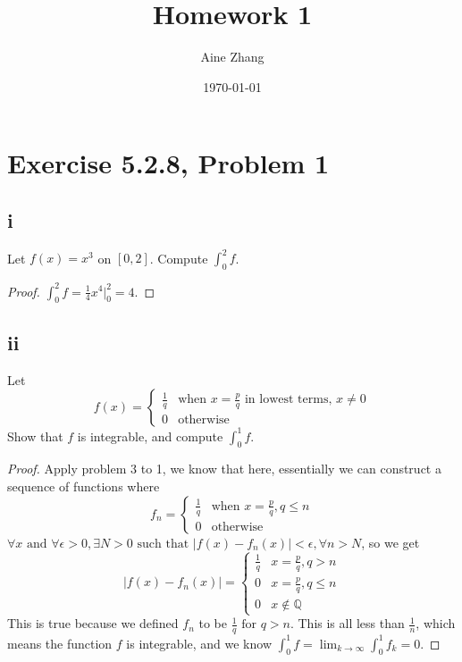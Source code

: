 \documentclass{article}
\title{Homework 1}
\author{Aine Zhang}
\date\today
\begin{document}
\maketitle %

\section*{Exercise 5.2.8, Problem 1}
\subsection*{i} Let $ f (x) = x^3$ on $[0, 2]$. Compute $\int^2_0f$.
\begin{proof}
$\int^2_0 f = \frac{1}{4}x^4 \vert^{2}_{0} = 4$.
\end{proof}
\subsection*{ii} 
Let
$$
f(x) = 
\begin{cases}
    \frac{1}{q} &  \text{when } x = \frac{p}{q} \text{ in lowest terms, } x \neq 0\\
    0 & \text{otherwise}
\end{cases}
$$
Show that $f$ is integrable, and compute $\int^1_0 f$.
\begin{proof}
Apply problem 3 to 1, we know that here, essentially we can construct a sequence of functions where
$$
f_n  = 
\begin{cases}
    \frac{1}{q} &  \text{when } x = \frac{p}{q},  q \leq n\\
    0 & \text{otherwise}
\end{cases}
$$
$\forall x \text{ and }\forall \epsilon >0, \exists N>0 \text{ such that } |f(x)-f_n(x)| < \epsilon,  \forall n >N$, so we get  
$$ |f(x)-f_n(x)|= 
\begin{cases}
    \frac{1}{q} &  x = \frac{p}{q}, q > n\\
    0 & x = \frac{p}{q}, q \leq n \\
    0 & x \notin \mathbb{Q}
\end{cases}$$
This is true because we defined $f_n$ to be $\frac{1}{q} \text{ for } q>n$. This is all less than $\frac{1}{n}$, which means the function $f$ is integrable, and we know $\int^1_0f = \lim_{k \rightarrow \infty} \int^1_0 f_k =0$.

\end{proof}
\end{document}
